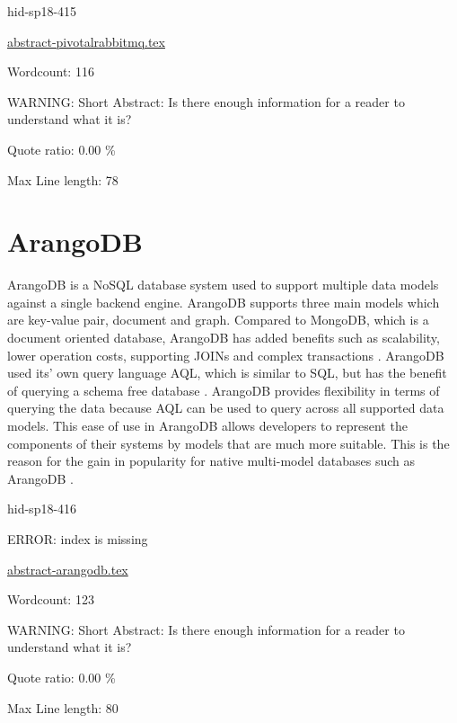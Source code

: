 \begin{IU}

hid-sp18-415

\href{https://github.com/cloudmesh-community/hid-sp18-415/blob/master//technology/abstract-pivotalrabbitmq.tex}{abstract-pivotalrabbitmq.tex}

 

Wordcount: 116

WARNING: Short Abstract: Is there enough information for a reader to understand what it is?


Quote ratio: 0.00 \%
 
Max Line length: 78
\end{IU}

\section{ArangoDB}

ArangoDB is a NoSQL database system used to support multiple data models against
a single backend engine. ArangoDB supports three main models which are key-value
pair, document and graph. Compared to MongoDB, which is a document oriented
database, ArangoDB has added benefits such as scalability, lower operation
costs, supporting JOINs and complex transactions
\cite{hid-sp18-416-www-arangodb}. ArangoDB used its' own query language AQL,
which is similar to SQL,
but has the benefit of querying a schema free database
\cite{hid-sp18-416-www-aql-blog}. ArangoDB provides flexibility in terms of
querying the data because
AQL can be used to query across all supported data models. This ease of use in
ArangoDB allows developers to represent the components of their systems by
models that are much more suitable. This is the reason for the gain in
popularity for native multi-model databases such as ArangoDB
\cite{hid-sp18-416-www-graphdb-blog}.

\begin{IU}

hid-sp18-416

ERROR: index is missing

\href{https://github.com/cloudmesh-community/hid-sp18-416/blob/master//technology/abstract-arangodb.tex}{abstract-arangodb.tex}

 

Wordcount: 123

WARNING: Short Abstract: Is there enough information for a reader to understand what it is?


Quote ratio: 0.00 \%
 
Max Line length: 80
\end{IU}

